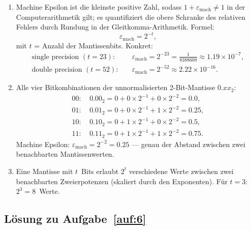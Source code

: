\documentclass[a4paper,11pt]{scrartcl}
\begin{document}
\begin{enumerate}[label=(\alph*)]
  \item Machine Epsilon ist die kleinste positive Zahl, sodass $1 + \varepsilon_{\text{mach}} \neq 1$ in der Computerarithmetik gilt; es quantifiziert die obere Schranke des relativen Fehlers durch Rundung in der Gleitkomma-Arithmetik. Formel:
  \[
  \varepsilon_{\text{mach}} = 2^{-t},
  \]
  mit $t$ = Anzahl der Mantissenbits. Konkret:
  \begin{align*}
  \text{single precision } (t = 23):&\quad \varepsilon_{\text{mach}} = 2^{-23} = \tfrac{1}{8388608} \approx 1.19 \times 10^{-7},\\
  \text{double precision } (t = 52):&\quad \varepsilon_{\text{mach}} = 2^{-52} \approx 2.22 \times 10^{-16}.
  \end{align*}
  \item Alle vier Bitkombinationen der unnormalisierten 2-Bit-Mantisse $0.xx_2$:
  \begin{align*}
  00:\ & 0.00_2 = 0 + 0 \times 2^{-1} + 0 \times 2^{-2} = 0.0,\\
  01:\ & 0.01_2 = 0 + 0 \times 2^{-1} + 1 \times 2^{-2} = 0.25,\\
  10:\ & 0.10_2 = 0 + 1 \times 2^{-1} + 0 \times 2^{-2} = 0.5,\\
  11:\ & 0.11_2 = 0 + 1 \times 2^{-1} + 1 \times 2^{-2} = 0.75.
  \end{align*}
  Machine Epsilon: $\varepsilon_{\text{mach}} = 2^{-2} = 0.25$ --- genau der Abstand zwischen zwei benachbarten Mantissenwerten.
  \item Eine Mantisse mit $t$~Bits erlaubt $2^t$ verschiedene Werte zwischen zwei benachbarten Zweierpotenzen (skaliert durch den Exponenten). Für $t = 3$: $2^3 = 8$~Werte.
\end{enumerate}

\subsection*{Lösung zu Aufgabe~\ref{auf:6}}
\end{document}
